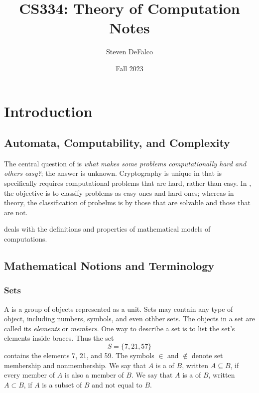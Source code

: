 \documentclass{article}
\title{CS334: Theory of Computation Notes}
\author{Steven DeFalco}
\date{Fall 2023}
\begin{document}
\maketitle
\tableofcontents
\newpage



\section{Introduction}

\subsection{Automata, Computability, and Complexity}

The central question of  is \emph{what makes some problems computationally hard and others easy?}; the answer is unknown. Cryptography is unique in that is specifically requires computational problems that are hard, rather than easy. 
In , the objective is to classify problems as easy ones and hard ones; whereas in  theory, the classification of probelms is by those that are solvable and those that are not. 

 deals with the definitions and properties of mathematical models of computations. 

\subsection{Mathematical Notions and Terminology}

\subsubsection{Sets} 

A  is a group of objects represented as a unit. Sets may contain any type of object, including numbers, symbols, and even othber sets. The objects in a set are called its \emph{elements} or \emph{members}. One way to describe a set is to list the set's elements inside braces. Thus the set  $$S = \{7,21,57\}$$ contains the elements 7, 21, and 59. The symbols $\in$ and $\notin$ denote set membership and nonmembership. We say that $A$ is a  of $B$, written $A \subseteq B$, if every member of $A$ is also a member of $B$. We say that $A$ is a  of $B$, written $A \subset B$, if $A$ is a subset of $B$ and not equal to $B$. \\ 
\end{document}
